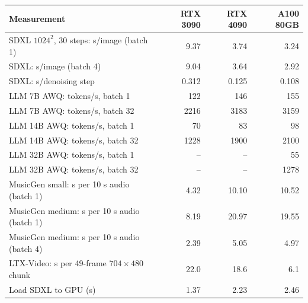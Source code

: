 \begin{tabular}{@{}lrrr@{}}
\toprule
\textbf{Measurement} & \textbf{RTX 3090} & \textbf{RTX 4090} & \textbf{A100 80GB} \\
\midrule
SDXL $1024^2$, 30 steps: s/image (batch 1) & 9.37 & 3.74 & 3.24 \\
SDXL: s/image (batch 4) & 9.04 & 3.64 & 2.92 \\
SDXL: s/denoising step & 0.312 & 0.125 & 0.108 \\
LLM 7B AWQ: tokens/s, batch 1 & 122 & 146 & 155 \\
LLM 7B AWQ: tokens/s, batch 32 & 2216 & 3183 & 3159 \\
LLM 14B AWQ: tokens/s, batch 1 & 70 & 83 & 98 \\
LLM 14B AWQ: tokens/s, batch 32 & 1228 & 1900 & 2100 \\
LLM 32B AWQ: tokens/s, batch 1 & -- & -- & 55 \\
LLM 32B AWQ: tokens/s, batch 32 & -- & -- & 1278 \\
MusicGen small: s per 10 s audio (batch 1) & 4.32 & 10.10 & 10.52 \\
MusicGen medium: s per 10 s audio (batch 1) & 8.19 & 20.97 & 19.55 \\
MusicGen medium: s per 10 s audio (batch 4) & 2.39 & 5.05 & 4.97 \\
LTX-Video: s per 49-frame $704{\times}480$ chunk & 22.0 & 18.6 & 6.1 \\
Load SDXL to GPU (s) & 1.37 & 2.23 & 2.46 \\
\bottomrule
\end{tabular}
